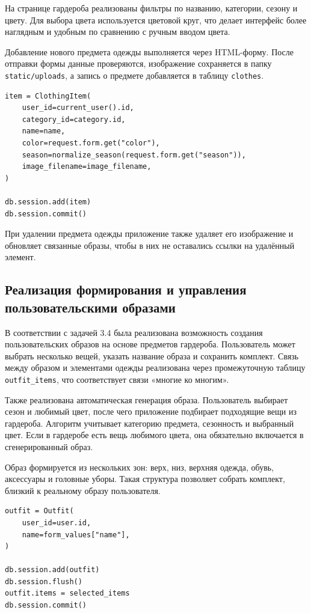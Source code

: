 На странице гардероба реализованы фильтры по названию, категории, сезону и цвету. Для выбора цвета используется цветовой круг, что делает интерфейс более наглядным и удобным по сравнению с ручным вводом цвета.

Добавление нового предмета одежды выполняется через HTML-форму. После отправки формы данные проверяются, изображение сохраняется в папку \texttt{static/uploads}, а запись о предмете добавляется в таблицу \texttt{clothes}.

\begin{lstlisting}[caption={Создание элемента гардероба}, label={lst:create_clothing}]
item = ClothingItem(
    user_id=current_user().id,
    category_id=category.id,
    name=name,
    color=request.form.get("color"),
    season=normalize_season(request.form.get("season")),
    image_filename=image_filename,
)

db.session.add(item)
db.session.commit()
\end{lstlisting}

При удалении предмета одежды приложение также удаляет его изображение и обновляет связанные образы, чтобы в них не оставались ссылки на удалённый элемент.

\subsection{Реализация формирования и управления пользовательскими образами}

В соответствии с задачей 3.4 была реализована возможность создания пользовательских образов на основе предметов гардероба. Пользователь может выбрать несколько вещей, указать название образа и сохранить комплект. Связь между образом и элементами одежды реализована через промежуточную таблицу \texttt{outfit\_items}, что соответствует связи «многие ко многим».

Также реализована автоматическая генерация образа. Пользователь выбирает сезон и любимый цвет, после чего приложение подбирает подходящие вещи из гардероба. Алгоритм учитывает категорию предмета, сезонность и выбранный цвет. Если в гардеробе есть вещь любимого цвета, она обязательно включается в сгенерированный образ.

Образ формируется из нескольких зон: верх, низ, верхняя одежда, обувь, аксессуары и головные уборы. Такая структура позволяет собрать комплект, близкий к реальному образу пользователя.

\begin{lstlisting}[caption={Формирование связи образа с вещами}, label={lst:outfit_items}]
outfit = Outfit(
    user_id=user.id,
    name=form_values["name"],
)

db.session.add(outfit)
db.session.flush()
outfit.items = selected_items
db.session.commit()
\end{lstlisting}

